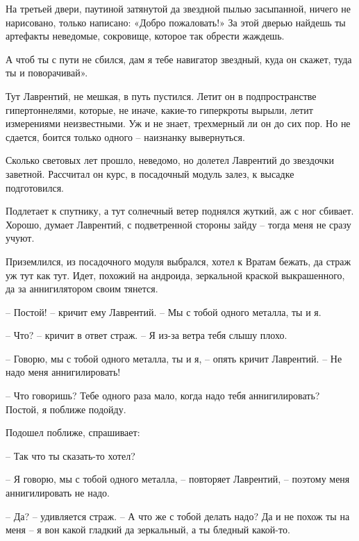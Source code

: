 \documentclass[ebook,oneside,final,openright]{memoir}
\begin{document}
\par
На третьей двери, паутиной затянутой да звездной пылью засыпанной, ничего не нарисовано, только написано: «Добро пожаловать!» За этой дверью найдешь ты артефакты неведомые, сокровище, которое так обрести жаждешь.\par
\par
А чтоб ты с пути не сбился, дам я тебе навигатор звездный, куда он скажет, туда ты и поворачивай».\par
\par
Тут Лаврентий, не мешкая, в путь пустился. Летит он в подпространстве гипертоннелями, которые, не иначе, какие-то гиперкроты вырыли, летит измерениями неизвестными. Уж и не знает, трехмерный ли он до сих пор. Но не сдается, боится только одного – наизнанку вывернуться.\par
\par
Сколько световых лет прошло, неведомо, но долетел Лаврентий до звездочки заветной. Рассчитал он курс, в посадочный модуль залез, к высадке подготовился.\par
\par
Подлетает к спутнику, а тут солнечный ветер поднялся жуткий, аж с ног сбивает. Хорошо, думает Лаврентий, с подветренной стороны зайду – тогда меня не сразу учуют. \par
\par
 Приземлился, из посадочного модуля выбрался, хотел к Вратам бежать, да страж уж тут как тут. Идет, похожий на андроида, зеркальной краской выкрашенного, да за аннигилятором своим тянется. \par
 \par
– Постой! – кричит ему Лаврентий. – Мы с тобой одного металла, ты и я. \par
– Что? – кричит в ответ страж. – Я из-за ветра тебя слышу плохо. \par
– Говорю, мы с тобой одного металла, ты и я, – опять кричит Лаврентий. – Не надо меня аннигилировать!\par
– Что говоришь? Тебе одного раза мало, когда надо тебя аннигилировать? Постой, я поближе подойду. \par
Подошел поближе, спрашивает: \par
– Так что ты сказать-то хотел? \par
– Я говорю, мы с тобой одного металла, – повторяет Лаврентий, – поэтому меня аннигилировать не надо. \par
– Да? – удивляется страж. – А что же с тобой делать надо? Да и не похож ты на меня – я вон какой гладкий да зеркальный, а ты бледный какой-то. \par
\end{document}
